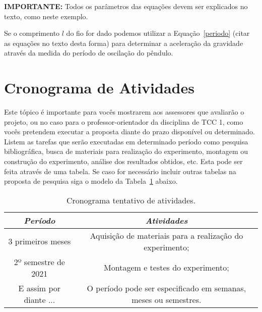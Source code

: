 \documentclass[12pt,oneside,brazil,hidelinks,article,sumario=tradicional,a4paper]{abntex2}
\begin{document}
\noindent
{\textbf{\color{red}IMPORTANTE:} Todos os parâmetros das equações devem ser explicados no texto, como neste exemplo.}

Se o comprimento $l$ do fio for dado podemos utilizar a Equação~\eqref{periodo} ({\color{red}citar as equações no texto desta forma}) para determinar a aceleração da gravidade através da medida do período de oscilação do pêndulo.


\section{Cronograma de Atividades}

Este tópico é importante para vocês mostrarem aos assessores que avaliarão o projeto, ou no caso para o professor-orientador da disciplina de TCC 1, como vocês pretendem executar a proposta diante do prazo disponível ou determinado. Listem as tarefas que serão executadas em determinado período como pesquisa bibliográfica, busca de materiais para realização do experimento, montagem ou construção do experimento, análise dos resultados obtidos, etc. Esta pode ser feita através de uma tabela. Se caso for necessário incluir outras tabelas na proposta de pesquisa siga o modelo da Tabela~\ref{tabela1} abaixo.

\begin{table}[ht!]
  \centering
  \caption{Cronograma tentativo de atividades.}\label{tabela1}
  \begin{tabular}{cc}
    \toprule
    \textbf{\emph{Período}} & \textbf{\emph{Atividades}}\\
    \midrule
    3 primeiros meses      & Aquisição de materiais para a realização do experimento;        \\
    2º semestre de 2021    & Montagem e testes do experimento;                               \\
    E assim por diante ... & O período pode ser especificado em semanas, meses ou semestres. \\
    \bottomrule
  \end{tabular}
\end{table}
\end{document}
